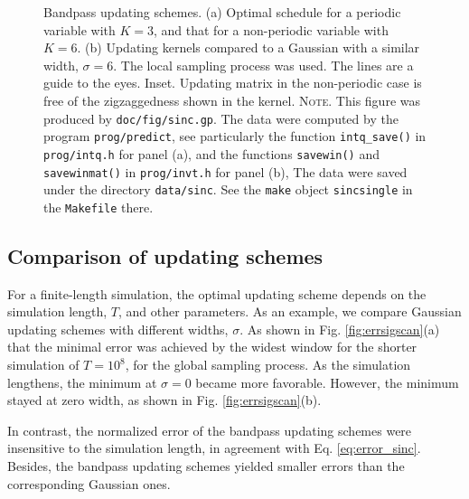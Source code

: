 \documentclass[reprint, floatfix]{revtex4-1}
\newcommand{\note}[1]{{\color{DarkGreen}\footnotesize \textsc{Note.} #1}}
\begin{document}
\begin{figure}[h]
\begin{center}
  \caption{
    \label{fig:sinc}
    Bandpass updating schemes.
    (a) Optimal schedule for a periodic variable
    with $K = 3$,
    and that for a non-periodic variable
    with $K = 6$.
    (b) Updating kernels
    compared to a Gaussian with a similar width,
    $\sigma = 6$.
    The local sampling process was used.
    The lines are a guide to the eyes.
    Inset. Updating matrix in the non-periodic case
    is free of the zigzaggedness shown in the kernel.
    \note{This figure was produced by \texttt{doc/fig/sinc.gp}.
      The data were computed by the program \texttt{prog/predict},
      see particularly the function \texttt{intq\_save()}
      in \texttt{prog/intq.h} for panel (a),
      and the functions \texttt{savewin()}
      and \texttt{savewinmat()}
      in \texttt{prog/invt.h} for panel (b),
      The data were saved under the directory \texttt{data/sinc}.
      See the \texttt{make} object \texttt{sincsingle}
      in the \texttt{Makefile} there.
    }%
  }
\end{center}
\end{figure}





\subsection{\label{sec:results_cmpschemes}
Comparison of updating schemes}



For a finite-length simulation,
the optimal updating scheme
depends on the simulation length, $T$,
and other parameters.
%
As an example,
we compare Gaussian updating schemes
with different widths, $\sigma$.
%
As shown in Fig. \ref{fig:errsigscan}(a)
that the minimal error was achieved
by the widest window for the shorter simulation
of $T = 10^8$,
for the global sampling process.
%
As the simulation lengthens,
the minimum at $\sigma = 0$ became more favorable.
%
However,
the minimum stayed at zero width,
as shown in Fig. \ref{fig:errsigscan}(b).


In contrast,
the normalized error of the bandpass updating schemes
were insensitive to the simulation length,
in agreement with Eq. \eqref{eq:error_sinc}.
%
Besides, the bandpass updating schemes
yielded smaller errors than
the corresponding Gaussian ones.
\end{document}

